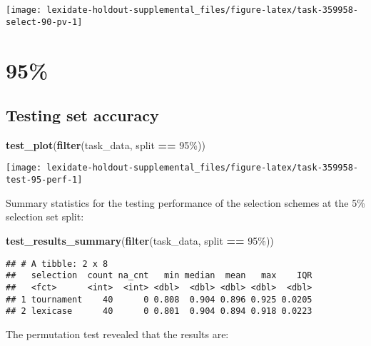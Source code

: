 \documentclass[
]{book}
\newenvironment{Shaded}{\begin{snugshade}}{\end{snugshade}}
\newcommand{\FunctionTok}[1]{\textcolor[rgb]{0.13,0.29,0.53}{\textbf{#1}}}
\newcommand{\NormalTok}[1]{#1}
\newcommand{\SpecialCharTok}[1]{\textcolor[rgb]{0.81,0.36,0.00}{\textbf{#1}}}
\newcommand{\StringTok}[1]{\textcolor[rgb]{0.31,0.60,0.02}{#1}}
\begin{document}
\texttt{[image: lexidate-holdout-supplemental\_files/figure-latex/task-359958-select-90-pv-1]}

\hypertarget{section-34}{%
\section{95\%}\label{section-34}}

\hypertarget{testing-set-accuracy-34}{%
\subsection{Testing set accuracy}\label{testing-set-accuracy-34}}

\begin{Shaded}
\begin{Highlighting}[]
\FunctionTok{test\_plot}\NormalTok{(}\FunctionTok{filter}\NormalTok{(task\_data, split }\SpecialCharTok{==} \StringTok{\textquotesingle{}95\%\textquotesingle{}}\NormalTok{))}
\end{Highlighting}
\end{Shaded}

\texttt{[image: lexidate-holdout-supplemental\_files/figure-latex/task-359958-test-95-perf-1]}

Summary statistics for the testing performance of the selection schemes at the 5\% selection set split:

\begin{Shaded}
\begin{Highlighting}[]
\FunctionTok{test\_results\_summary}\NormalTok{(}\FunctionTok{filter}\NormalTok{(task\_data, split }\SpecialCharTok{==} \StringTok{\textquotesingle{}95\%\textquotesingle{}}\NormalTok{))}
\end{Highlighting}
\end{Shaded}

\begin{verbatim}
## # A tibble: 2 x 8
##   selection  count na_cnt   min median  mean   max    IQR
##   <fct>      <int>  <int> <dbl>  <dbl> <dbl> <dbl>  <dbl>
## 1 tournament    40      0 0.808  0.904 0.896 0.925 0.0205
## 2 lexicase      40      0 0.801  0.904 0.894 0.918 0.0223
\end{verbatim}

The permutation test revealed that the results are:
\end{document}
